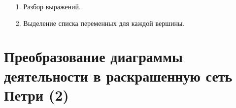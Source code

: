 \documentclass[12pt]{article}
\begin{document}
\begin{minipage}[H]{0.55\linewidth}
\end{minipage}
\hfill
\begin{minipage}[H]{0.44\linewidth}
	\begin{enumerate}
	\item[1.] Разбор выражений.
	\item[2.] Выделение списка переменных для каждой вершины.
	\end{enumerate}
\end{minipage}

\section{Преобразование диаграммы деятельности в раскрашенную сеть  Петри (2)}
\end{document}
